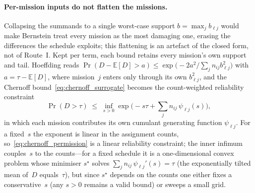 \documentclass[11pt,a4paper]{article}
\theoremstyle{plain}
\theoremstyle{definition}
\theoremstyle{remark}
\begin{document}
\paragraph{Per-mission inputs do not flatten the missions.}
Collapsing the summands to a single worst-case support $b = \max_j b_{\ell j}$ would make Bernstein treat every mission as the most damaging one, erasing the differences the schedule exploits; this flattening is an artefact of the closed form, not of Route~I.
Kept per term, each bound retains every mission's own support and tail.
Hoeffding reads $\Pr(D - \mathbb{E}[D] > a) \le \exp\!\big( -2a^2 / \sum_j n_{ij} b_{\ell j}^2 \big)$ with $a = \tau - \mathbb{E}[D]$, where mission~$j$ enters only through its own $b_{\ell j}^2$, and the Chernoff bound~\eqref{eq:chernoff_surrogate} becomes the count-weighted reliability constraint
\begin{equation}\label{eq:chernoff_permission}
  \Pr(D > \tau) \;\le\; \inf_{s > 0} \exp\!\Big( -s\tau + \sum_j n_{ij}\,\psi_{\ell j}(s) \Big),
\end{equation}
in which each mission contributes its own cumulant generating function $\psi_{\ell j}$.
For a fixed~$s$ the exponent is linear in the assignment counts, so~\eqref{eq:chernoff_permission} is a linear reliability constraint; the inner infimum couples~$s$ to the counts---for a fixed schedule it is a one-dimensional convex problem whose minimiser $s^\star$ solves $\sum_j n_{ij}\,\psi_{\ell j}'(s) = \tau$ (the exponentially tilted mean of~$D$ equals~$\tau$), but since $s^\star$ depends on the counts one either fixes a conservative~$s$ (any $s > 0$ remains a valid bound) or sweeps a small grid.
\end{document}
